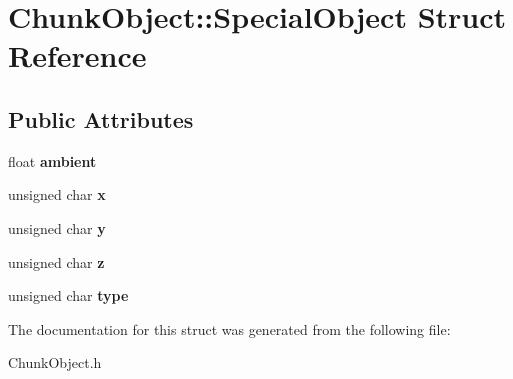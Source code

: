 \hypertarget{structChunkObject_1_1SpecialObject}{\section{\-Chunk\-Object\-:\-:\-Special\-Object \-Struct \-Reference}
\label{structChunkObject_1_1SpecialObject}
}
\subsection*{\-Public \-Attributes}
\begin{DoxyCompactItemize}
\item 
\hypertarget{structChunkObject_1_1SpecialObject_ab89a110276d7ea1c697b27152fad3d66}{float {\bfseries ambient}}\label{structChunkObject_1_1SpecialObject_ab89a110276d7ea1c697b27152fad3d66}

\item 
\hypertarget{structChunkObject_1_1SpecialObject_aff5a1595ecf4a483d3e669a26dee4ee5}{unsigned char {\bfseries x}}\label{structChunkObject_1_1SpecialObject_aff5a1595ecf4a483d3e669a26dee4ee5}

\item 
\hypertarget{structChunkObject_1_1SpecialObject_a9290909aa98cd97a05ea5731d9d0a63c}{unsigned char {\bfseries y}}\label{structChunkObject_1_1SpecialObject_a9290909aa98cd97a05ea5731d9d0a63c}

\item 
\hypertarget{structChunkObject_1_1SpecialObject_a19f5885824f14b3df3bbc52dd22e8e86}{unsigned char {\bfseries z}}\label{structChunkObject_1_1SpecialObject_a19f5885824f14b3df3bbc52dd22e8e86}

\item 
\hypertarget{structChunkObject_1_1SpecialObject_ac897609005420295f9fa312dcb6f89b2}{unsigned char {\bfseries type}}\label{structChunkObject_1_1SpecialObject_ac897609005420295f9fa312dcb6f89b2}

\end{DoxyCompactItemize}


\-The documentation for this struct was generated from the following file\-:\begin{DoxyCompactItemize}
\item 
\-Chunk\-Object.\-h\end{DoxyCompactItemize}
